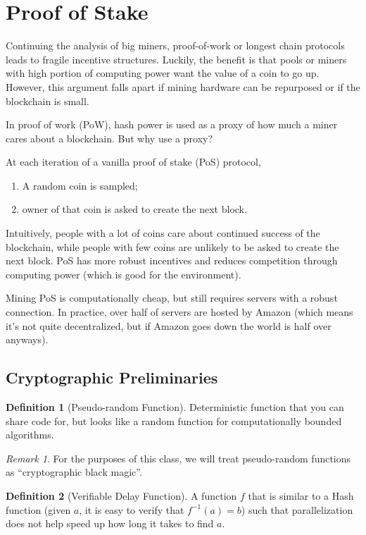 \documentclass[dvipsnames]{article}
\theoremstyle{definition}
\newtheorem{definition}{Definition}[section]
\theoremstyle{remark}
\newtheorem*{remark}{Remark}
\begin{document}
\newpage

\section{Proof of Stake}

Continuing the analysis of big miners, proof-of-work or longest chain protocols leads to fragile incentive structures. Luckily, the benefit is that pools or miners with high portion of computing power want the value of a coin to go up. However, this argument falls apart if mining hardware can be repurposed or if the blockchain is small.

In proof of work (PoW), hash power is used as a proxy of how much a miner cares about a blockchain. But why use a proxy?

At each iteration of a vanilla proof of stake (PoS) protocol,
\begin{enumerate}
	\item A random coin is sampled;
	\item owner of that coin is asked to create the next block.
\end{enumerate}
Intuitively, people with a lot of coins care about continued success of the blockchain, while people with few coins are unlikely to be asked to create the next block. PoS has more robust incentives and reduces competition through computing power (which is good for the environment).

Mining PoS is computationally cheap, but still requires servers with a robust connection. In practice, over half of servers are hosted by Amazon (which means it's not quite decentralized, but if Amazon goes down the world is half over anyways). 

\subsection{Cryptographic Preliminaries}

\begin{definition}[Pseudo-random Function]
	Deterministic function that you can share code for, but looks like a random function for computationally bounded algorithms. 
\end{definition}
\begin{remark}
	For the purposes of this class, we will treat pseudo-random functions as ``cryptographic black magic''.
\end{remark}

\begin{definition}[Verifiable Delay Function]
	A function $f$ that is similar to a Hash function (given $a$, it is easy to verify that $f^{-1}(a) = b$) such that parallelization does not help speed up how long it takes to find $a$.
\end{definition}
\end{document}
